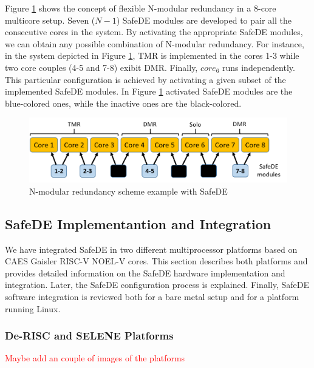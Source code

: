 Figure \ref{fig:N_modular_redundancy} shows the concept of flexible N-modular redundancy in a 8-core multicore setup. Seven ($N-1$) SafeDE modules are developed to pair all the consecutive cores in the system. By activating the appropriate SafeDE modules, we can obtain any possible combination of N-modular redundancy. For instance, in the system depicted in Figure \ref{fig:N_modular_redundancy}, TMR is implemented in the cores 1-3 while two core couples (4-5 and 7-8) exibit DMR. Finally, $core_6$ runs independently. This particular configuration is achieved by activating a given subset of the implemented SafeDE modules. In Figure \ref{fig:N_modular_redundancy} activated SafeDE modules are the blue-colored ones, while the inactive ones are the black-colored.


\begin{figure}[h]
    \centering
    \includegraphics[scale=0.75]{img/Nmodular.png}
    \caption{N-modular redundancy scheme example with SafeDE}
    \label{fig:N_modular_redundancy}
\end{figure}

\bigskip



\subsection{SafeDE Implementantion and Integration}

We have integrated SafeDE in two different multiprocessor platforms based on CAES Gaisler RISC-V NOEL-V cores. This section describes both platforms and provides detailed information on the SafeDE hardware implementation and integration. Later, the SafeDE configuration process is explained. Finally, SafeDE software integration is reviewed both for a bare metal setup and for a platform running Linux.    



\subsubsection{De-RISC and SELENE Platforms}
\textcolor{red}{Maybe add an couple of images of the platforms}


